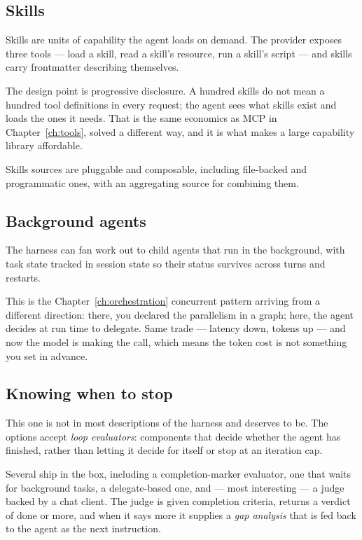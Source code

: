 \subsection{Skills}

Skills are units of capability the agent loads on demand. The provider exposes
three tools --- load a skill, read a skill's resource, run a skill's script ---
and skills carry frontmatter describing themselves.

The design point is progressive disclosure. A hundred skills do not mean a
hundred tool definitions in every request; the agent sees what skills exist and
loads the ones it needs. That is the same economics as MCP in
Chapter~\ref{ch:tools}, solved a different way, and it is what makes a large
capability library affordable.

Skills sources are pluggable and composable, including file-backed and
programmatic ones, with an aggregating source for combining them.

\subsection{Background agents}

The harness can fan work out to child agents that run in the background, with
task state tracked in session state so their status survives across turns and
restarts.

This is the Chapter~\ref{ch:orchestration} concurrent pattern arriving from a
different direction: there, you declared the parallelism in a graph; here, the
agent decides at run time to delegate. Same trade --- latency down, tokens up ---
and now the model is making the call, which means the token cost is not something
you set in advance.

\subsection{Knowing when to stop}
\label{sec:harness-loop}

This one is not in most descriptions of the harness and deserves to be. The
options accept \emph{loop evaluators}: components that decide whether the agent
has finished, rather than letting it decide for itself or stop at an iteration
cap.

Several ship in the box, including a completion-marker evaluator, one that waits
for background tasks, a delegate-based one, and --- most interesting --- a judge
backed by a chat client. The judge is given completion criteria, returns a
verdict of done or more, and when it says more it supplies a \emph{gap analysis}
that is fed back to the agent as the next instruction.

